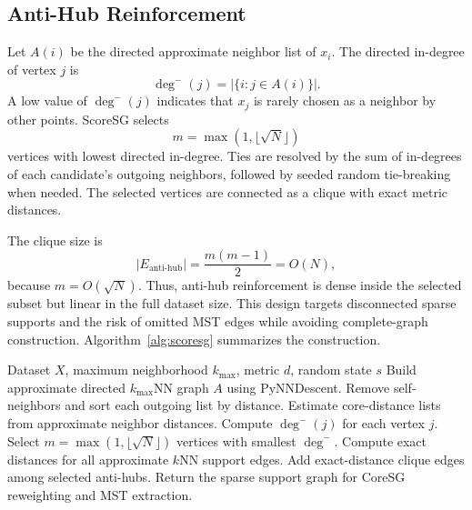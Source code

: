 \documentclass[11pt]{article}
\begin{document}
\subsection{Anti-Hub Reinforcement}

Let \(A(i)\) be the directed approximate neighbor list of \(x_i\). The directed in-degree of vertex \(j\) is
\begin{equation}
  \deg^{-}(j)=|\{i: j \in A(i)\}|.
\end{equation}
A low value of \(\deg^{-}(j)\) indicates that \(x_j\) is rarely chosen as a neighbor by other points. ScoreSG selects
\begin{equation}
  m=\max(1,\lfloor\sqrt{N}\rfloor)
\end{equation}
vertices with lowest directed in-degree. Ties are resolved by the sum of in-degrees of each candidate's outgoing neighbors, followed by seeded random tie-breaking when needed. The selected vertices are connected as a clique with exact metric distances.

The clique size is
\begin{equation}
  |E_{\mathrm{anti\text{-}hub}}|=\frac{m(m-1)}{2}=O(N),
\end{equation}
because \(m=O(\sqrt{N})\). Thus, anti-hub reinforcement is dense inside the selected subset but linear in the full dataset size. This design targets disconnected sparse supports and the risk of omitted MST edges while avoiding complete-graph construction. Algorithm~\ref{alg:scoresg} summarizes the construction.

\begin{algorithm}[H]
\caption{ScoreSG support-graph construction}
\label{alg:scoresg}
\begin{algorithmic}[1]
\Require Dataset \(X\), maximum neighborhood \(k_{\max}\), metric \(d\), random state \(s\)
\State Build approximate directed \(k_{\max}\)NN graph \(A\) using PyNNDescent.
\State Remove self-neighbors and sort each outgoing list by distance.
\State Estimate core-distance lists from approximate neighbor distances.
\State Compute \(\deg^{-}(j)\) for each vertex \(j\).
\State Select \(m=\max(1,\lfloor\sqrt{N}\rfloor)\) vertices with smallest \(\deg^{-}\).
\State Compute exact distances for all approximate \(k\)NN support edges.
\State Add exact-distance clique edges among selected anti-hubs.
\State Return the sparse support graph for CoreSG reweighting and MST extraction.
\end{algorithmic}
\end{algorithm}
\end{document}
